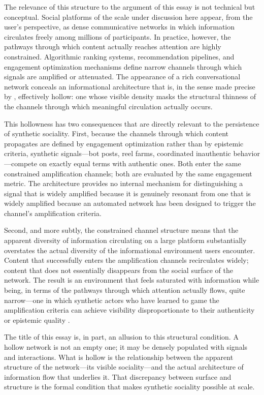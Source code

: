 \documentclass[12pt,a4paper]{article}
\begin{document}
The relevance of this structure to the argument of this essay is not technical but conceptual.
Social platforms of the scale under discussion here appear, from the user's perspective, as
dense communicative networks in which information circulates freely among millions of
participants. In practice, however, the pathways through which content actually reaches attention
are highly constrained. Algorithmic ranking systems, recommendation pipelines, and engagement
optimization mechanisms define narrow channels through which signals are amplified or
attenuated. The appearance of a rich conversational network conceals an informational
architecture that is, in the sense made precise by \citet{gloy2025}, effectively hollow: one
whose visible density masks the structural thinness of the channels through which meaningful
circulation actually occurs.

This hollowness has two consequences that are directly relevant to the persistence of synthetic
sociality. First, because the channels through which content propagates are defined by engagement
optimization rather than by epistemic criteria, synthetic signals---bot posts, reel farms,
coordinated inauthentic behavior---compete on exactly equal terms with authentic ones. Both enter
the same constrained amplification channels; both are evaluated by the same engagement metric.
The architecture provides no internal mechanism for distinguishing a signal that is widely
amplified because it is genuinely resonant from one that is widely amplified because an automated
network has been designed to trigger the channel's amplification criteria.

Second, and more subtly, the constrained channel structure means that the apparent diversity of
information circulating on a large platform substantially overstates the actual diversity of the
informational environment users encounter. Content that successfully enters the amplification
channels recirculates widely; content that does not essentially disappears from the social
surface of the network. The result is an environment that feels saturated with information while
being, in terms of the pathways through which attention actually flows, quite narrow---one in
which synthetic actors who have learned to game the amplification criteria can achieve visibility
disproportionate to their authenticity or epistemic quality \citep{vosoughi2018,tufekci2015}.

The title of this essay is, in part, an allusion to this structural condition. A hollow network
is not an empty one; it may be densely populated with signals and interactions. What is hollow
is the relationship between the apparent structure of the network---its visible sociality---and
the actual architecture of information flow that underlies it. That discrepancy between surface
and structure is the formal condition that makes synthetic sociality possible at scale.
\end{document}
